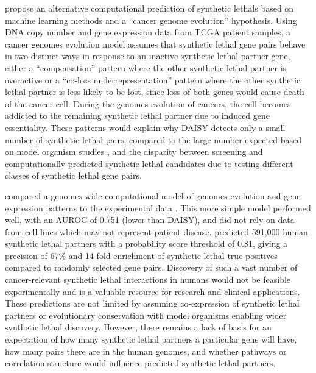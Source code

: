 \citet{Lu2015} propose an alternative computational prediction of \glspl{synthetic lethal} based on machine learning methods and a ``cancer genome evolution'' hypothesis. Using \acrshort{DNA} copy number and \gls{gene expression} data from \gls{TCGA} patient samples, a cancer \glspl{genome} evolution model assumes that \gls{synthetic lethal} gene pairs behave in two distinct ways in response to an inactive \gls{synthetic lethal} partner gene, either a ``compensation'' pattern where the other \gls{synthetic lethal} partner is overactive or a ``co-loss underrepresentation'' pattern where the other \gls{synthetic lethal} partner is less likely to be lost, since loss of both genes would cause death of the cancer cell. During the \glspl{genome} evolution of cancers, the cell becomes addicted to the remaining \gls{synthetic lethal} partner due to induced gene essentiality. These patterns would explain why \gls{DAISY} detects only a small number of \gls{synthetic lethal} pairs, compared to the large number expected based on model organism studies \citep{Boone2007}, and the disparity between screening and computationally predicted \gls{synthetic lethal} candidates due to testing different classes of \gls{synthetic lethal} gene pairs. 

\citet{Lu2015} compared a \glspl{genome}-wide computational model of \glspl{genome} evolution and \gls{gene expression} patterns to the experimental data \citep{Vizeacoumar2013, Laufer2013}. This more simple model performed well, with an \gls{AUROC} of 0.751 (lower than \gls{DAISY}), and did not rely on data from cell lines which may not represent patient disease. \citet{Lu2015} predicted 591,000 human \gls{synthetic lethal} partners with a probability score threshold of 0.81, giving a precision of 67\% and 14-fold enrichment of \gls{synthetic lethal} true positives compared to randomly selected gene pairs. Discovery of such a vast number of cancer-relevant \gls{synthetic lethal} interactions in humans would not be feasible experimentally and is a valuable resource for research and clinical applications. These predictions are not limited by assuming co-expression of \gls{synthetic lethal} partners or evolutionary conservation with model organisms enabling wider \gls{synthetic lethal} discovery. However, there remains a lack of basis for an expectation of how many \gls{synthetic lethal} partners a particular gene will have, how many pairs there are in the human \glspl{genome}, and whether \glspl{pathway} or correlation structure would influence predicted \gls{synthetic lethal} partners. 

